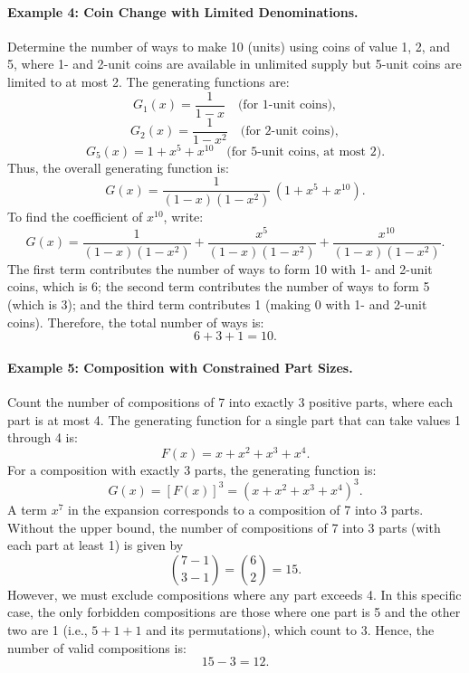 \documentclass[docmute]{article}
\begin{document}
\bigskip

\paragraph{Example 4: Coin Change with Limited Denominations.}
Determine the number of ways to make 10 (units) using coins of value 1, 2, and 5, where 1- and 2-unit coins are available in unlimited supply but 5-unit coins are limited to at most 2. The generating functions are:
\[
G_1(x)=\frac{1}{1-x} \quad \text{(for 1-unit coins)},
\]
\[
G_2(x)=\frac{1}{1-x^2} \quad \text{(for 2-unit coins)},
\]
\[
G_5(x)=1+x^5+x^{10} \quad \text{(for 5-unit coins, at most 2)}.
\]
Thus, the overall generating function is:
\[
G(x)=\frac{1}{(1-x)(1-x^2)}\,(1+x^5+x^{10}).
\]
To find the coefficient of \(x^{10}\), write:
\[
G(x)=\frac{1}{(1-x)(1-x^2)}+\frac{x^5}{(1-x)(1-x^2)}+\frac{x^{10}}{(1-x)(1-x^2)}.
\]
The first term contributes the number of ways to form 10 with 1- and 2-unit coins, which is 6; the second term contributes the number of ways to form 5 (which is 3); and the third term contributes 1 (making 0 with 1- and 2-unit coins). Therefore, the total number of ways is:
\[
6+3+1=10.
\]

\bigskip

\paragraph{Example 5: Composition with Constrained Part Sizes.}
Count the number of compositions of 7 into exactly 3 positive parts, where each part is at most 4. The generating function for a single part that can take values 1 through 4 is:
\[
F(x)=x+x^2+x^3+x^4.
\]
For a composition with exactly 3 parts, the generating function is:
\[
G(x)=[F(x)]^3=(x+x^2+x^3+x^4)^3.
\]
A term \(x^7\) in the expansion corresponds to a composition of 7 into 3 parts. Without the upper bound, the number of compositions of 7 into 3 parts (with each part at least 1) is given by
\[
\binom{7-1}{3-1}=\binom{6}{2}=15.
\]
However, we must exclude compositions where any part exceeds 4. In this specific case, the only forbidden compositions are those where one part is 5 and the other two are 1 (i.e., \(5+1+1\) and its permutations), which count to 3. Hence, the number of valid compositions is:
\[
15-3=12.
\]

\bigskip
\end{document}
